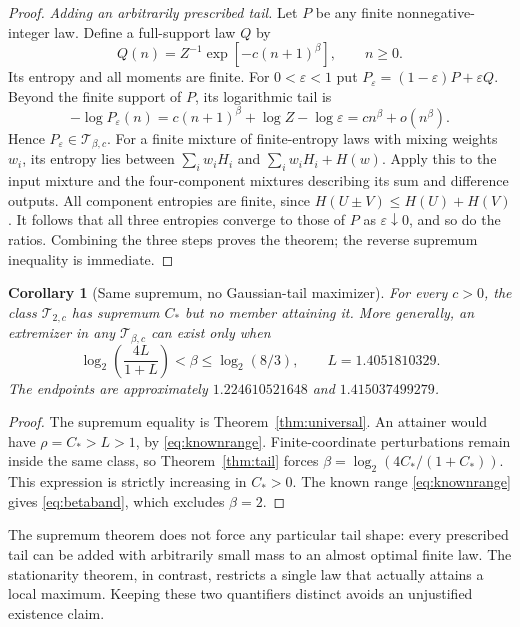 \documentclass[11pt]{article}
\newtheorem{corollary}[theorem]{Corollary}
\theoremstyle{remark}\newtheorem{remark}[theorem]{Remark}
\begin{document}
\begin{proof}
\emph{Adding an arbitrarily prescribed tail.} Let $P$ be any finite
nonnegative-integer law. Define a full-support law $Q$ by
\[
 Q(n)=Z^{-1}\exp[-c(n+1)^\beta],\qquad n\geq0.
\]
Its entropy and all moments are finite. For $0<\varepsilon<1$ put
$P_\varepsilon=(1-\varepsilon)P+\varepsilon Q$. Beyond the finite support
of $P$, its logarithmic tail is
\[
 -\log P_\varepsilon(n)=c(n+1)^\beta+\log Z-\log\varepsilon
 =c n^\beta+o(n^\beta).
\]
Hence $P_\varepsilon\in\mathcal T_{\beta,c}$. For a finite mixture of
finite-entropy laws with mixing weights $w_i$, its entropy lies between
$\sum_iw_iH_i$ and $\sum_iw_iH_i+H(w)$. Apply this to the input mixture and
the four-component mixtures describing its sum and difference outputs.
All component entropies are finite, since $H(U\pm V)\leq H(U)+H(V)$.
It follows that all three entropies converge to those of $P$ as
$\varepsilon\downarrow0$, and so do the ratios. Combining the three steps
proves the theorem; the reverse supremum inequality is immediate.
\end{proof}

\begin{corollary}[Same supremum, no Gaussian-tail maximizer]\label{cor:nonattain}
For every $c>0$, the class $\mathcal T_{2,c}$ has supremum $C_*$ but no
member attaining it. More generally, an extremizer in any
$\mathcal T_{\beta,c}$ can exist only when
\begin{equation}\label{eq:betaband}
 \log_2\!\left(\frac{4L}{1+L}\right)<\beta\leq\log_2(8/3),
 \qquad L=1.4051810329.
\end{equation}
The endpoints are approximately $1.224610521648$ and $1.415037499279$.
\end{corollary}
\begin{proof}
The supremum equality is Theorem~\ref{thm:universal}. An attainer would have
$\rho=C_*>L>1$, by \eqref{eq:knownrange}. Finite-coordinate perturbations
remain inside the same class, so Theorem~\ref{thm:tail} forces
$\beta=\log_2(4C_* /(1+C_*))$. This expression is strictly increasing in
$C_*>0$. The known range \eqref{eq:knownrange} gives \eqref{eq:betaband},
which excludes $\beta=2$.
\end{proof}

The supremum theorem does not force any particular tail shape: every
prescribed tail can be added with arbitrarily small mass to an almost
optimal finite law. The stationarity theorem, in contrast, restricts a
single law that actually attains a local maximum. Keeping these two
quantifiers distinct avoids an unjustified existence claim.
\end{document}
